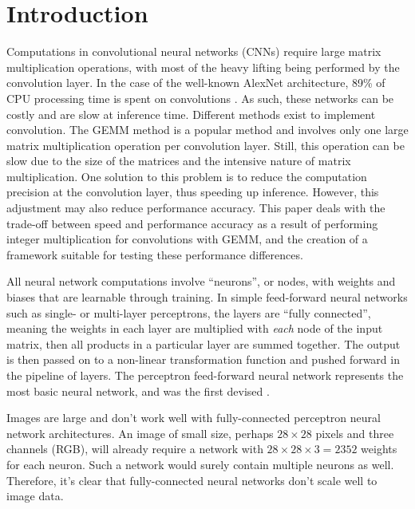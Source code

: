 \chapter{Introduction}

Computations in convolutional neural networks (CNNs) require large matrix multiplication operations, with most of the heavy lifting being performed by the convolution layer. In the case of the well-known AlexNet architecture, 89\% of CPU processing time is spent on convolutions \cite{warden_gemm}. As such, these networks can be costly and are slow at inference time. Different methods exist to implement convolution. The GEMM method is a popular method and involves only one large matrix multiplication operation per convolution layer. Still, this operation can be slow due to the size of the matrices and the intensive nature of matrix multiplication. One solution to this problem is to reduce the computation precision at the convolution layer, thus speeding up inference. However, this adjustment may also reduce performance accuracy. This paper deals with the trade-off between speed and performance accuracy as a result of performing integer multiplication for convolutions with GEMM, and the creation of a framework suitable for testing these performance differences.

All neural network computations involve ``neurons'', or nodes, with weights and biases that are learnable through training. In simple feed-forward neural networks such as single- or multi-layer perceptrons, the layers are ``fully connected'', meaning the weights in each layer are multiplied with \textit{each} node of the input matrix, then all products in a particular layer are summed together. The output is then passed on to a non-linear transformation function and pushed forward in the pipeline of layers. The perceptron feed-forward neural network represents the most basic neural network, and was the first devised \cite{perceptron}.

Images are large and don't work well with fully-connected perceptron neural network architectures. An image of small size, perhaps $28\times28$ pixels and three channels (RGB), will already require a network with $28\times28\times3 = 2352$ weights for each neuron. Such a network would surely contain multiple neurons as well. Therefore, it's clear that fully-connected neural networks don't scale well to image data. 

